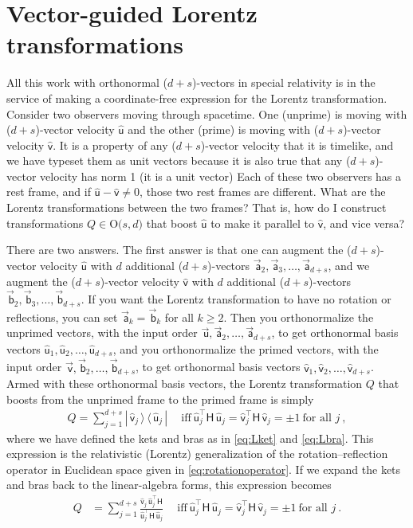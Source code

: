 \documentclass{article}
\newcommand{\metric}{\mathsf{H}}
\newcommand\upvec[1]{\!\vec{\,\mathrm{#1}}}
\newcommand{\Lvec}[1]{\upvec{\mathsf{#1}}} %
\newcommand{\Lhat}[1]{\hat{\mathsf{#1}}} %
\newcommand{\ketbra}[2]{|\,{#1}\,\rangle\,\langle\,{#2}\,|}
\newcommand{\plus}{\!+\!} %
\begin{document}
\section{Vector-guided Lorentz transformations}\label{sec:lt}

All this work with orthonormal ($d\plus s$)-vectors in special relativity is in the service of making a coordinate-free expression for the Lorentz transformation.
Consider two observers moving through spacetime.
One (unprime) is moving with ($d\plus s$)-vector velocity $\Lhat{u}$ and the other (prime) is moving with ($d\plus s$)-vector velocity $\Lhat{v}$.
It is a property of any ($d\plus s$)-vector velocity that it is timelike, and we have typeset them as unit vectors because it is also true that any ($d\plus s$)-vector velocity has norm 1 (it is a unit vector)
Each of these two observers has a rest frame, and if $\Lhat{u}-\Lhat{v}\neq 0$, those two rest frames are different.
What are the Lorentz transformations between the two frames?
That is, how do I construct transformations $Q\in\mbox{O($s,d$)}$ that boost $\Lhat{u}$ to make it parallel to $\Lhat{v}$, and vice versa?

There are two answers.
The first answer is that one can augment the ($d\plus s$)-vector velocity $\Lhat{u}$ with $d$ additional ($d\plus s$)-vectors $\Lvec{a}_2,\Lvec{a}_3,\ldots,\Lvec{a}_{d+s}$, and we augment the ($d\plus s$)-vector velocity $\Lhat{v}$ with $d$ additional ($d\plus s$)-vectors $\Lvec{b}_2,\Lvec{b}_3,\ldots,\Lvec{b}_{d+s}$.
If you want the Lorentz transformation to have no rotation or reflections, you can set $\Lvec{a}_k=\Lvec{b}_k$ for all $k\geq 2$.
Then you orthonormalize the unprimed vectors, with the input order $\Lvec{u},\Lvec{a}_2,\ldots,\Lvec{a}_{d+s}$, to get orthonormal basis vectors $\Lhat{u}_1,\Lhat{u}_2,\ldots,\Lhat{u}_{d+s}$, and you orthonormalize the primed vectors, with the input order $\Lvec{v},\Lvec{b}_2,\ldots,\Lvec{b}_{d+s}$, to get orthonormal basis vectors $\Lhat{v}_1,\Lhat{v}_2,\ldots,\Lhat{v}_{d+s}$.
Armed with these orthonormal basis vectors, the Lorentz transformation $Q$ that boosts from the unprimed frame to the primed frame is simply
\begin{align}
  Q = \sum_{j=1}^{d+s} \ketbra{\Lhat{v}_j}{\Lhat{u}_j} \quad~ \mbox{iff} ~ \Lhat{u}_j^\top\metric\,\Lhat{u}_j = \Lhat{v}_j^\top\metric\,\Lhat{v}_j = \pm 1 ~ \mbox{for all $j$} \label{eq:LTQM} ~,
\end{align}
where we have defined the kets and bras as in \eqref{eq:Lket} and \eqref{eq:Lbra}.
This expression is the relativistic (Lorentz) generalization of the rotation--reflection operator in Euclidean space given in \eqref{eq:rotationoperator}.
If we expand the kets and bras back to the linear-algebra forms, this expression becomes
\begin{align}
  Q &= \sum_{j=1}^{d+s} \frac{\Lhat{v}_j\,\Lhat{u}_j^\top\metric}{\Lhat{u}_j^\top\metric\,\Lhat{u}_j} \quad~ \mbox{iff} ~ \Lhat{u}_j^\top\metric\,\Lhat{u}_j = \Lhat{v}_j^\top\metric\,\Lhat{v}_j = \pm 1 ~ \mbox{for all $j$} ~.
\end{align}
\end{document}
